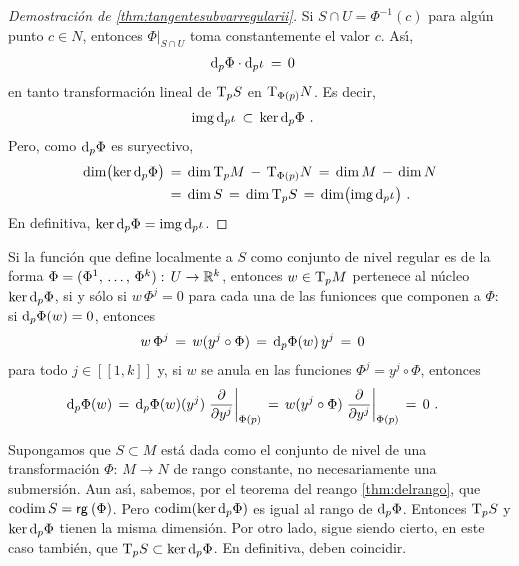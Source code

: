 \begin{proof}[Demostraci\'{o}n de \ref{thm:tangentesubvarregularii}]
	Si $S\cap U=\Phi^{-1}(c)$ para alg\'{u}n punto $c\in N$, entonces
	$\Phi|_{S\cap U}$ toma constantemente el valor $c$. As\'{\i},
	\begin{align*}
		\diferencial[p]{\Phi}\cdot\diferencial[p]{\inc} & \,=\,0
	\end{align*}
	en tanto transformaci\'{o}n lineal de $\tangente[p]{S}$ en
	$\tangente[\Phi(p)]{N}$. Es decir,
	\begin{align*}
		\img\,\diferencial[p]{\inc} & \,\subset\,
		\ker\,\diferencial[p]{\Phi}
		\text{ .}
	\end{align*}
	Pero, como $\diferencial[p]{\Phi}$ es suryectivo,
	\begin{align*}
		\dim\big(\ker\,\diferencial[p]{\Phi}\big) & \,=\,
			\dim\,\tangente[p]{M}\,-\,\tangente[\Phi(p)]{N}
			\,=\,\dim\,M\,-\,\dim\,N \\
		& \,=\,\dim\,S \,=\, \dim\,\tangente[p]{S}
		\,=\,\dim\big(\img\,\diferencial[p]{\inc}\big)
		\text{ .}
	\end{align*}
	En definitiva,
	$\ker\,\diferencial[p]{\Phi}=\img\,\diferencial[p]{\inc}$.
\end{proof}

\begin{obsTangenteValorRegular}\label{obs:tangentevalorregular}
Si la funci\'{o}n que define localmente a $S$ como conjunto de nivel regular
es de la forma $\Phi=(\lista*{\Phi}{k}):\,U\rightarrow\bb{R}^{k}$, entonces
$w\in\tangente[p]{M}$ pertenece al n\'{u}cleo $\ker\,\diferencial[p]{\Phi}$,
si y s\'{o}lo si $w\,\Phi^{j}=0$ para cada una de las funionces que
componen a $\Phi$: si $\diferencial[p]{\Phi}(w)=0$, entonces
\begin{align*}
	w\,\Phi^{j} & \,=\,w(y^{j}\circ\Phi) \,=\,
		\diferencial[p]{\Phi}(w)\,y^{j} \,=\, 0
\end{align*}
%
para todo $j\in [\![1,k]\!]$ y, si $w$ se anula en las funciones
$\Phi^{j}=y^{j}\circ\Phi$, entonces
\begin{align*}
	\diferencial[p]{\Phi}(w) & \,=\,
		\diferencial[p]{\Phi}(w)(y^{j})\gancho[\Phi(p)]{y^{j}}
		\,=\,w(y^{j}\circ\Phi)\gancho[\Phi(p)]{y^{j}}
		\,=\, 0
	\text{ .}
\end{align*}
%
\end{obsTangenteValorRegular}

\begin{obsTangenteConjuntoDeNivel}\label{obs:tangeteconjuntodenivel}
	Supongamos que $S\subset M$ est\'{a} dada como el conjunto de nivel de
	una transformaci\'{o}n $\Phi:\,M\rightarrow N$ de rango constante,
	no necesariamente una submersi\'{o}n. Aun as\'{\i}, sabemos, por el
	teorema del reango \ref{thm:delrango}, que
	$\mathrm{codim}\,S=\mathsf{rg}_{}\left(\Phi\right)$. Pero $\codim(\ker\,\diferencial[p]{\Phi})$
	es igual al rango de $\diferencial[p]{\Phi}$. Entonces
	$\tangente[p]{S}$ y $\ker\,\diferencial[p]{\Phi}$ tienen la misma
	dimensi\'{o}n. Por otro lado, sigue siendo cierto, en este caso
	tambi\'{e}n, que $\tangente[p]{S}\subset\ker\,\diferencial[p]{\Phi}$.
	En definitiva, deben coincidir.
\end{obsTangenteConjuntoDeNivel}

